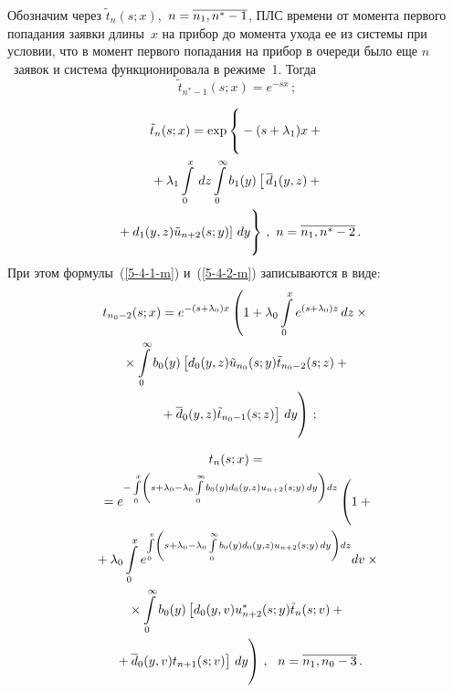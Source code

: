 \begin{multicols}{2}
Обозначим через $\tilde{t}_n(s;x)$,\  $n\hm=\overline{n_1,n^*-1}$,
ПЛС времени от момента первого попадания заявки длины~$x$
на прибор до момента ухода ее из системы при условии,
что в момент первого попадания на прибор в очереди
было еще $n$~заявок и система функционировала в
режиме~1.
Тогда
$$
\tilde{t}_{n^*-1}(s;x) = e^{-sx}\,;
$$

\vspace*{-12pt}

\noindent
\begin{multline*}
\tilde{t}_n(s;x) = \exp\left\{ \vphantom{\int\limits_0^x}
- (s + \lambda_1) x + {}\right.\\
{}+\lambda_1 \int\limits_0^x \,dz
\int\limits_0^\infty b_1(y) \left[\,\overline d_1(y,z) +{}\right.\\
\left.\left.{}+ d_1(y,z) \tilde{u}_{n+2}(s;y)\right] \, dy
\vphantom{\int\limits_0^\infty}
\right\}\,,\
n=\overline{n_1,n^*-2}\,.
\end{multline*}
При этом формулы~(\ref{5-4-1-m}) и~(\ref{5-4-2-m}) записываются
в виде:
\begin{multline*}
t_{n_0-2}(s;x)= e^{-(s + \lambda_0) x} \left( 
1 +
\lambda_0 \int\limits_0^x e^{(s + \lambda_0) z}\, dz\times{} \right.\\
{}\times
\int\limits_0^\infty b_0(y) \left[d_0(y,z) \tilde{u}_{n_0}(s;y) \tilde{t}_{n_0-2}(s;z)
+ {}\right.\\
\left.\left.{}+\overline d_0(y,z) \tilde{t}_{n_0-1}(s;z)\right] \, dy
\vphantom{\int\limits_0^x}
\right)\,;
\end{multline*}

\vspace*{-12pt}

\noindent
\begin{multline*}
t_n(s;x) = {}\\
{}=e^{- \int\limits_0^x \left(
s + \lambda_0 - \lambda_0 \int\limits_0^\infty b_0(y) d_0(y,z) u_{n+2}(s;y) \, dy\right)dz}
\left(  \vphantom{\int\limits_0^x}
1 +{}\right.\\
{}+ \lambda_0 \int\limits_0^x e^{ \int\limits_0^v \left(
s + \lambda_0 - \lambda_0 \int\limits_0^\infty b_0(y) d_0(y,z) u_{n+2}(s;y) \, dy \right)dz}
dv \times{}\\
{}\times
\int\limits_0^\infty b_0(y) \left[d_0(y,v) u_{n+2}^*(s;y) \tilde{t}_n(s;v)
+{}\right.\\
\left.\left.{}+ \overline d_0(y,v) t_{n+1}(s;v)\right] \, dy 
\vphantom{\int\limits_0^x}
\right)\,,
\ \ n=\overline{n_1,n_0-3}\,.
\end{multline*}


\end{multicols}

